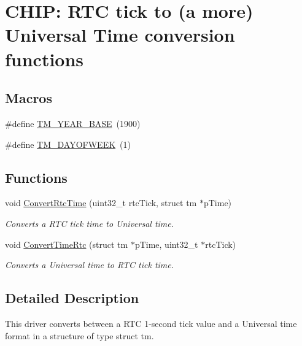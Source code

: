 \hypertarget{group___r_t_c___u_t}{}\section{C\+H\+IP\+: R\+TC tick to (a more) Universal Time conversion functions}
\label{group___r_t_c___u_t}
\subsection*{Macros}
\begin{DoxyCompactItemize}
\item 
\#define \hyperlink{group___r_t_c___u_t_ga0b24352233a7c91b5e627d2a26ffefb3}{T\+M\+\_\+\+Y\+E\+A\+R\+\_\+\+B\+A\+SE}~(1900)
\item 
\#define \hyperlink{group___r_t_c___u_t_ga35e3274b0fe1e51c0dcbbac47b0ccd24}{T\+M\+\_\+\+D\+A\+Y\+O\+F\+W\+E\+EK}~(1)
\end{DoxyCompactItemize}
\subsection*{Functions}
\begin{DoxyCompactItemize}
\item 
void \hyperlink{group___r_t_c___u_t_gab32979b30c7fb280248d6aecd3dccfab}{Convert\+Rtc\+Time} (uint32\+\_\+t rtc\+Tick, struct tm $\ast$p\+Time)
\begin{DoxyCompactList}\small\item\em Converts a R\+TC tick time to Universal time. \end{DoxyCompactList}\item 
void \hyperlink{group___r_t_c___u_t_ga4923243ffbb19299329003af866ca4bb}{Convert\+Time\+Rtc} (struct tm $\ast$p\+Time, uint32\+\_\+t $\ast$rtc\+Tick)
\begin{DoxyCompactList}\small\item\em Converts a Universal time to R\+TC tick time. \end{DoxyCompactList}\end{DoxyCompactItemize}


\subsection{Detailed Description}
This driver converts between a R\+TC 1-\/second tick value and a Universal time format in a structure of type \textquotesingle{}struct tm\textquotesingle{}. 

